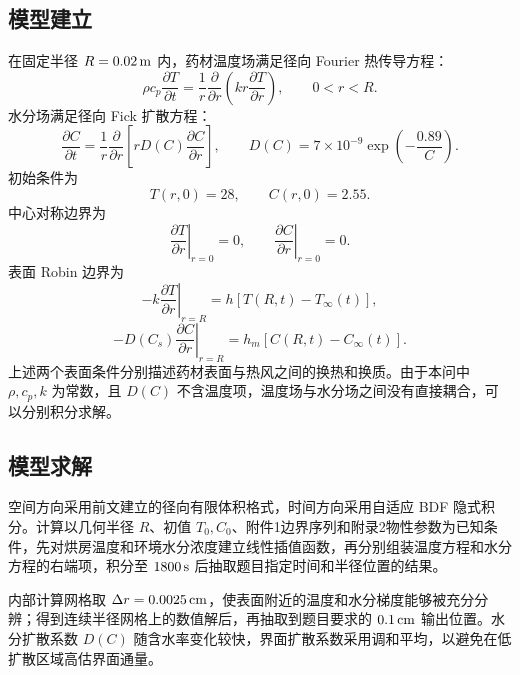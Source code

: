 \documentclass[UTF8,a4paper,12pt]{ctexart}
\begin{document}
\subsection{模型建立}
在固定半径 $R=0.02\rm\,m$ 内，药材温度场满足径向 Fourier 热传导方程：
\begin{equation}
  \rho c_p\frac{\partial T}{\partial t}
  =\frac1r\frac{\partial}{\partial r}
  \left(kr\frac{\partial T}{\partial r}\right),
  \qquad 0<r<R.
\end{equation}
水分场满足径向 Fick 扩散方程：
\begin{equation}
  \frac{\partial C}{\partial t}
  =\frac1r\frac{\partial}{\partial r}
  \left[rD(C)\frac{\partial C}{\partial r}\right],
  \qquad
  D(C)=7\times10^{-9}\exp\left(-\frac{0.89}{C}\right).
\end{equation}
初始条件为
\begin{equation}
  T(r,0)=28,\qquad C(r,0)=2.55.
\end{equation}
中心对称边界为
\begin{equation}
  \left.\frac{\partial T}{\partial r}\right|_{r=0}=0,\qquad
  \left.\frac{\partial C}{\partial r}\right|_{r=0}=0.
\end{equation}
表面 Robin 边界为
\begin{equation}
  -k\left.\frac{\partial T}{\partial r}\right|_{r=R}
  =h\left[T(R,t)-T_\infty(t)\right],
\end{equation}
\begin{equation}
  -D(C_s)\left.\frac{\partial C}{\partial r}\right|_{r=R}
  =h_m\left[C(R,t)-C_\infty(t)\right].
\end{equation}
上述两个表面条件分别描述药材表面与热风之间的换热和换质。由于本问中 $\rho,c_p,k$ 为常数，且 $D(C)$ 不含温度项，温度场与水分场之间没有直接耦合，可以分别积分求解。

\subsection{模型求解}
空间方向采用前文建立的径向有限体积格式，时间方向采用自适应 BDF 隐式积分。计算以几何半径 $R$、初值 $T_0,C_0$、附件1边界序列和附录2物性参数为已知条件，先对烘房温度和环境水分浓度建立线性插值函数，再分别组装温度方程和水分方程的右端项，积分至 $1800\rm\,s$ 后抽取题目指定时间和半径位置的结果。

内部计算网格取 $\Delta r=0.0025\rm\,cm$，使表面附近的温度和水分梯度能够被充分分辨；得到连续半径网格上的数值解后，再抽取到题目要求的 $0.1\rm\,cm$ 输出位置。水分扩散系数 $D(C)$ 随含水率变化较快，界面扩散系数采用调和平均，以避免在低扩散区域高估界面通量。
\end{document}
